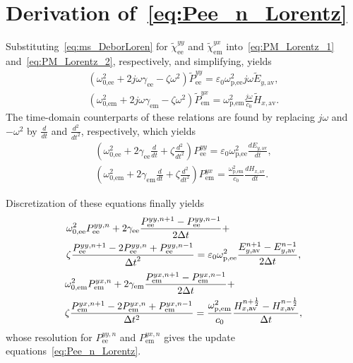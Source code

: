 \documentclass[journal]{IEEEtran}
\begin{document}



\appendices
\section{Derivation of~\eqref{eq:Pee_n_Lorentz}}\label{app:Lorentz_AF_descret}
Substituting~\eqref{eq:ms_DeborLoren} for $\tilde{\chi}_\textrm{ee}^{yy}$ and $\tilde{\chi}_\textrm{em}^{yx}$ into~\eqref{eq:PM_Lorentz_1} and~\eqref{eq:PM_Lorentz_2}, respectively, and simplifying, yields
\begin{align}\label{eq:app_Pee_n_Lorentz_S1}
  \left(\omega_\textrm{0,ee}^2+2j\omega\gamma_\textrm{ee}-\zeta\omega^2\right)\tilde{P}_\textrm{ee}^{yy}= \varepsilon_0\omega_\textrm{p,ee}^2j\omega\tilde{E}_{y,\textrm{av}},\\
  \left(\omega_\textrm{0,em}^2+2j\omega\gamma_\textrm{em}-\zeta\omega^2\right)\tilde{P}_\textrm{em}^{yx}= \omega_\textrm{p,em}^2\frac{j\omega}{c_0}\tilde{H}_{x,\textrm{av}}.
\end{align}
The time-domain counterparts of these relations are found by replacing $j\omega$ and $-\omega^2$ by $\frac{d}{dt}$ and $\frac{d^2}{dt^2}$, respectively, which yields
\begin{align}\label{eq:app_Pee_n_Lorentz_S2}
  \left(\omega_\textrm{0,ee}^2+2\gamma_\textrm{ee}\frac{d}{dt}+\zeta\frac{d^2}{dt^2}\right)P_\textrm{ee}^{yy}= \varepsilon_0\omega_\textrm{p,ee}^2\frac{dE_{y,\textrm{av}}}{dt},\\
  \left(\omega_\textrm{0,em}^2+2\gamma_\textrm{em}\frac{d}{dt}+\zeta\frac{d^2}{dt^2}\right)P_\textrm{em}^{yx}= \frac{\omega_\textrm{p,em}^2}{c_0}\frac{dH_{x,\textrm{av}}}{dt}.
\end{align}

Discretization of these equations finally yields
\begin{align}\label{eq:app_Pee_n_Lorentz_S3_1}
  &\omega_\textrm{0,ee}^2P_\textrm{ee}^{yy,n}+2\gamma_\textrm{ee}\frac{P_\textrm{ee}^{yy,n+1}-P_\textrm{ee}^{yy,n-1}}{2\Delta t}+\\\notag&\zeta\frac{P_\textrm{ee}^{yy,n+1}-2P_\textrm{ee}^{yy,n}+P_\textrm{ee}^{yy,n-1}}{{\Delta t}^2}= \varepsilon_0\omega_\textrm{p,ee}^2\frac{E_{y,\textrm{av}}^{n+1}-E_{y,\textrm{av}}^{n-1}}{2\Delta t},
\end{align}
\begin{align}\label{eq:app_Pee_n_Lorentz_S3_2}
    &\omega_\textrm{0,em}^2P_\textrm{em}^{yx,n}+2\gamma_\textrm{em}\frac{P_\textrm{em}^{yx,n+1}-P_\textrm{em}^{yx,n-1}}{2\Delta t}+\\\notag&\zeta\frac{P_\textrm{em}^{yx,n+1}-2P_\textrm{em}^{yx,n}+P_\textrm{em}^{yx,n-1}}{\Delta t^2}= \frac{\omega_\textrm{p,em}^2}{c_0}\frac{H_{x,\textrm{av}}^{n+\frac{1}{2}}-H_{x,\textrm{av}}^{n-\frac{1}{2}}}{\Delta t},
\end{align}
%
whose resolution for $P_\textrm{ee}^{yy,n}$ and $P_\textrm{em}^{yx,n}$ gives the update equations~\eqref{eq:Pee_n_Lorentz}.
\end{document}
